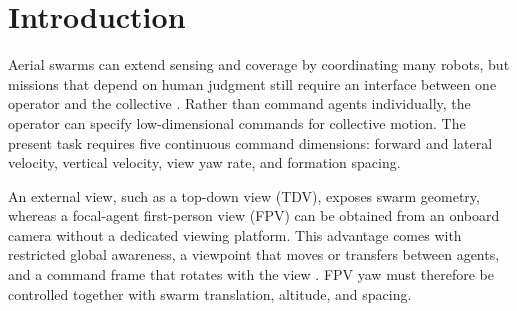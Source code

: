 \begin{abstract}
Aerial-swarm teleoperation from an immersive first-person view (FPV) requires
continuous control of collective motion, view direction, and formation size.
We present a participant-calibrated upper-body interface for five-degree-of-
freedom control of a simulated aerial swarm. Torso inclination, controller
height and separation, and head yaw command planar velocity, vertical velocity,
inter-agent spacing, and view-yaw rate. In a within-subject study, 14
participants navigated a 15-agent swarm through three-dimensional obstacle
courses using body motion and a conventional transmitter. The complete
body-motion system reduced completion time by 19.4\% and centroid travel
distance by 7.0\%. An exploratory trajectory analysis also found 8.6\% less
three-dimensional cross-track motion. Delivered-command variation was lower
with body motion, although this comparison included interface-specific
filtering. No clear differences were detected in task accuracy, swarm
integrity, overall workload, or usability, whereas physical demand was higher
with body motion for all participants. These findings demonstrate a
task-specific efficiency advantage for the implemented body-motion system,
without isolating the effects of input modality, command mapping, or signal
processing.
\end{abstract}


\section{Introduction}




Aerial swarms can extend sensing and coverage by coordinating many robots, but
missions that depend on human judgment still require an interface between one
operator and the collective
\cite{kolling2016survey,ben_focaldrone}. Rather than command agents
individually, the operator can specify low-dimensional commands for collective
motion.
The present task requires five continuous command dimensions: forward and
lateral velocity, vertical velocity, view yaw rate, and formation spacing.


An external view, such as a top-down view (TDV), exposes swarm geometry, whereas a focal-agent first-person
view (FPV) can be obtained from an onboard camera without a dedicated viewing
platform. This advantage comes with restricted global awareness, a viewpoint
that moves or transfers between agents, and a command frame that rotates with
the view \cite{ben_focaldrone,macchini2021impact}. FPV yaw must therefore be
controlled together with swarm translation, altitude, and spacing.

